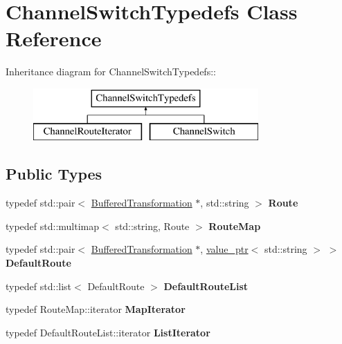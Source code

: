\hypertarget{class_channel_switch_typedefs}{
\section{ChannelSwitchTypedefs Class Reference}
\label{class_channel_switch_typedefs}
}
Inheritance diagram for ChannelSwitchTypedefs::\begin{figure}[H]
\begin{center}
\leavevmode
\includegraphics[height=2cm]{class_channel_switch_typedefs}
\end{center}
\end{figure}
\subsection*{Public Types}
\begin{DoxyCompactItemize}
\item 
\hypertarget{class_channel_switch_typedefs_a6c3a9f4fbf9e2a83bdd72d28afda897f}{
typedef std::pair$<$ \hyperlink{class_buffered_transformation}{BufferedTransformation} $\ast$, std::string $>$ {\bfseries Route}}
\label{class_channel_switch_typedefs_a6c3a9f4fbf9e2a83bdd72d28afda897f}

\item 
\hypertarget{class_channel_switch_typedefs_a3d8fc0d570dbae4ded006e88226d5771}{
typedef std::multimap$<$ std::string, Route $>$ {\bfseries RouteMap}}
\label{class_channel_switch_typedefs_a3d8fc0d570dbae4ded006e88226d5771}

\item 
\hypertarget{class_channel_switch_typedefs_a682b7749e2ce307e095e389ab63aa3b7}{
typedef std::pair$<$ \hyperlink{class_buffered_transformation}{BufferedTransformation} $\ast$, \hyperlink{classvalue__ptr}{value\_\-ptr}$<$ std::string $>$ $>$ {\bfseries DefaultRoute}}
\label{class_channel_switch_typedefs_a682b7749e2ce307e095e389ab63aa3b7}

\item 
\hypertarget{class_channel_switch_typedefs_a11ae9855b128a98f9bfed9d6413dcca0}{
typedef std::list$<$ DefaultRoute $>$ {\bfseries DefaultRouteList}}
\label{class_channel_switch_typedefs_a11ae9855b128a98f9bfed9d6413dcca0}

\item 
\hypertarget{class_channel_switch_typedefs_a5928e683ccad25bc9c340208326db91e}{
typedef RouteMap::iterator {\bfseries MapIterator}}
\label{class_channel_switch_typedefs_a5928e683ccad25bc9c340208326db91e}

\item 
\hypertarget{class_channel_switch_typedefs_abb2b4ce9c6a4ef4a773f026beee70e57}{
typedef DefaultRouteList::iterator {\bfseries ListIterator}}
\label{class_channel_switch_typedefs_abb2b4ce9c6a4ef4a773f026beee70e57}

\end{DoxyCompactItemize}


